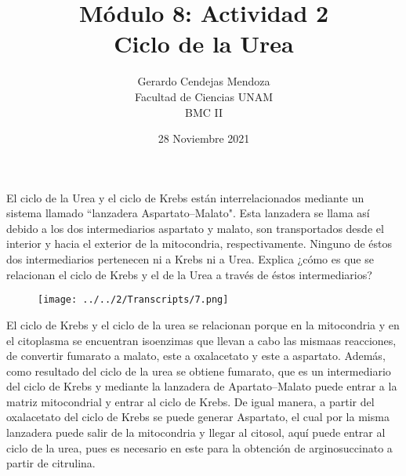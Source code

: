 \documentclass[12pt]{article}
\begin{document}
	\renewcommand{\figurename}{Figura}
	
	\title {Módulo 8: Actividad 2\\Ciclo de la Urea}
	\date{28 Noviembre 2021}
	\author{Gerardo Cendejas Mendoza\\ Facultad de Ciencias UNAM\\BMC II}
	
	\maketitle
	
	El ciclo de la Urea y el ciclo de Krebs están interrelacionados mediante un sistema llamado ``lanzadera Aspartato--Malato". Esta lanzadera se llama así debido a los dos intermediarios aspartato y malato, son transportados desde el interior y hacia el exterior de la mitocondria, respectivamente. Ninguno de éstos dos intermediarios pertenecen ni a Krebs ni a Urea. Explica ¿cómo es que se relacionan el ciclo de Krebs y el de la Urea a través de éstos intermediarios?
	
	\FloatBarrier
	\begin{figure}[h]
		\texttt{[image: ../../2/Transcripts/7.png]}
	\end{figure}
	\FloatBarrier
	
	\newpage
	
	El ciclo de Krebs y el ciclo de la urea se relacionan porque en la mitocondria y en el citoplasma se encuentran isoenzimas que llevan a cabo las mismaas reacciones, de convertir fumarato a malato, este a oxalacetato y este a aspartato. Además, como resultado del ciclo de la urea se obtiene fumarato, que es un intermediario del ciclo de Krebs y mediante la lanzadera de Apartato--Malato puede entrar a la matriz mitocondrial y entrar al ciclo de Krebs. De igual manera, a partir del oxalacetato del ciclo de Krebs se puede generar Aspartato, el cual por la misma lanzadera puede salir de la mitocondria y llegar al citosol, aquí puede entrar al ciclo de la urea, pues es necesario en este para la obtención de arginosuccinato a partir de citrulina.
	
\end{document}
